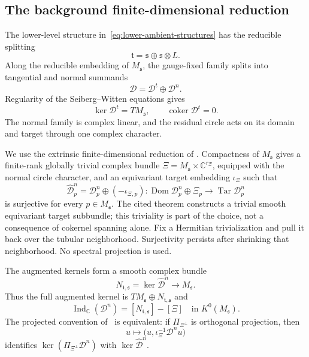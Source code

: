 \documentclass[11pt]{amsart}
\theoremstyle{definition}
\theoremstyle{remark}
\theoremstyle{plain}
\newcommand{\CC}{\mathbb{C}}
\newcommand{\coker}{\operatorname{coker}}
\begin{document}
\subsection{The background finite-dimensional reduction}
The lower-level structure in~\eqref{eq:lower-ambient-structures} has the
reducible splitting
\[
 \mathfrak t=\mathfrak s\oplus\mathfrak s\otimes L.
\]
Along the reducible embedding of $M_{\mathfrak s}$, the gauge-fixed family
splits into tangential and normal summands
\begin{equation}\label{eq:family-splitting}
 \mathscr D=\mathscr D^t\oplus\mathscr D^n.
\end{equation}
Regularity of the Seiberg--Witten equations gives
\begin{equation}\label{eq:tangential-family}
 \ker\mathscr D^t=TM_{\mathfrak s},\qquad
 \coker\mathscr D^t=0.
\end{equation}
The normal family is complex linear, and the residual circle acts on its
domain and target through one complex character.

We use the extrinsic finite-dimensional reduction of
\cite[Theorem~3.19]{FeehanLenessTopLevel}.  Compactness of $M_{\mathfrak s}$
gives a finite-rank globally trivial complex bundle
$\Xi=M_{\mathfrak s}\times\CC^{r_\Xi}$, equipped with the normal
circle character, and an equivariant target embedding
$\iota_\Xi$ such that
\begin{equation}\label{eq:global-augmentation}
 \widehat{\mathscr D}^{n}_p
 =\mathscr D^n_p\oplus(-\iota_{\Xi,p}):
 \operatorname{Dom}\mathscr D^n_p\oplus\Xi_p
 \longrightarrow\operatorname{Tar}\mathscr D^n_p
\end{equation}
is surjective for every $p\in M_{\mathfrak s}$.  The cited theorem constructs a trivial smooth equivariant target
subbundle; this triviality is part of the choice, not a consequence of
cokernel spanning alone.  Fix a Hermitian trivialization and pull it back
over the tubular neighborhood.  Surjectivity persists after shrinking that
neighborhood.  No spectral projection is used.

The augmented kernels form a smooth complex bundle
\begin{equation}\label{eq:normal-bundle-definition}
 N_{\mathfrak t,\mathfrak s}
 =\ker\widehat{\mathscr D}^{n}\longrightarrow M_{\mathfrak s}.
\end{equation}
Thus the full augmented kernel is
$TM_{\mathfrak s}\oplus N_{\mathfrak t,\mathfrak s}$ and
\begin{equation}\label{eq:index-family}
 \operatorname{Ind}_{\CC}(\mathscr D^n)
 =[N_{\mathfrak t,\mathfrak s}]-[\Xi]
 \quad\text{in }K^0(M_{\mathfrak s}).
\end{equation}
The projected convention of~\cite{FeehanLenessIII} is equivalent: if
$\Pi_{\Xi^\perp}$ is orthogonal projection, then
\begin{equation}\label{eq:projected-augmented-kernel}
 u\longmapsto\bigl(u,\iota_\Xi^{-1}\mathscr D^nu\bigr)
\end{equation}
identifies $\ker(\Pi_{\Xi^\perp}\mathscr D^n)$ with
$\ker\widehat{\mathscr D}^{n}$.
\end{document}
